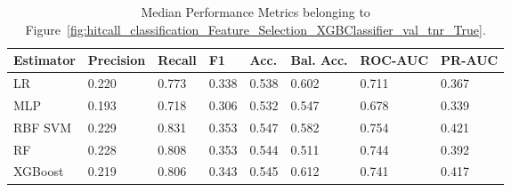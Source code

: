 \begin{longtable}{llllllll}
\caption{Median Performance Metrics belonging to Figure~\ref{fig:hitcall_classification_Feature_Selection_XGBClassifier_val_tnr_True}.}\label{tab:table:hitcall_classification_feature_selection_xgbclassifier_val_tnr_true}\\
\toprule
\midrule
\small Estimator & \small Precision & \small Recall & \small F1 & \small Acc. & \small Bal. Acc. & \small ROC-AUC & \small PR-AUC\\
\hline
LR & 0.220 & 0.773 & 0.338 & 0.538 & 0.602 & 0.711 & 0.367\\
MLP & 0.193 & 0.718 & 0.306 & 0.532 & 0.547 & 0.678 & 0.339\\
RBF SVM & 0.229 & 0.831 & 0.353 & 0.547 & 0.582 & 0.754 & 0.421\\
RF & 0.228 & 0.808 & 0.353 & 0.544 & 0.511 & 0.744 & 0.392\\
XGBoost & 0.219 & 0.806 & 0.343 & 0.545 & 0.612 & 0.741 & 0.417\\
\bottomrule
\end{longtable}